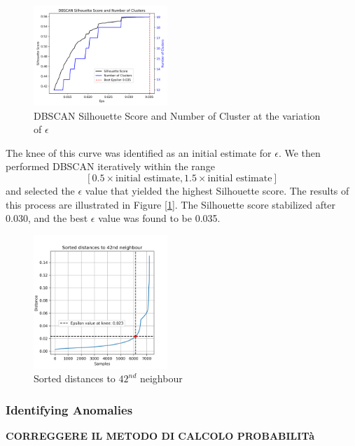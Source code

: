 \documentclass[a4paper]{article}
\begin{document}
\begin{figure}
    \centering
    \includegraphics[width=0.45\textwidth]{images/dbscan_silhouette.png}
    \caption{DBSCAN Silhouette Score and Number of Cluster at the variation of $\epsilon$}
    \label{fig:dbscan_silhouette}
\end{figure}

The knee of this curve was identified as an initial estimate for $\epsilon$. We then performed DBSCAN iteratively within the range $$[0.5 \times \text{initial estimate}, 1.5 \times \text{initial estimate}]$$ and selected the $\epsilon$ value that yielded the highest Silhouette score. The results of this process are illustrated in Figure [\ref{fig:dbscan_silhouette}]. The Silhouette score stabilized after 0.030, and the best $\epsilon$ value was found to be 0.035.

\begin{figure}
    \centering
    \includegraphics[width=0.45\textwidth]{images/dbscan_epsilon_knee.png}
    \caption{Sorted distances to $42^{nd}$ neighbour}
    \label{fig:dbscan_epsilon_knee}
\end{figure}

\subsubsection{Identifying Anomalies}
\textbf{CORREGGERE IL METODO DI CALCOLO PROBABILITà}
\end{document}
